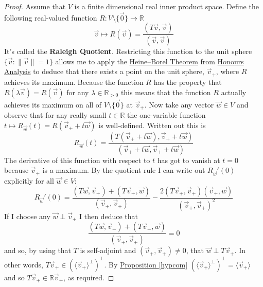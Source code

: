 \documentclass[11pt]{amsbook}
\theoremstyle{definition}
\begin{document}
\begin{proof}
Assume that $V$ is a finite dimensional real inner product space. Define the following real-valued function $R: V\setminus \{ \vec{0} \} \to\mathbb{R}$ $$\vec{v}\mapsto R(\vec{v}) = \frac{(T\vec{v}, \vec{v})}{(\vec{v}, \vec{v})}$$ It's called the {\bf Raleigh Quotient}. Restricting this function to the unit sphere $\{ \vec{v} : \| \vec{v} \| =1 \}$ allows me to apply the \href{http://en.wikipedia.org/wiki/Heine-Borel_theorem}{Heine--Borel Theorem} from \href{http://www.drps.ed.ac.uk/14-15/dpt/cxmath10068.htm}{Honours Analysis} to deduce that there exists a point on the unit sphere, $\vec{v}_+$, where $R$ achieves its maximum. Because the function $R$ has the property that $R(\lambda \vec{v}) = R(\vec{v})$ for any $\lambda \in \mathbb{R}_{>0}$ this means that the function $R$ actually achieves its maximum on all of $V\setminus \{ \vec{0} \}$ at $\vec{v}_+$. Now take any vector $\vec{w} \in V$ and observe that for any really small $t\in \mathbb{R}$ the one-variable function $t\mapsto R_{\vec{w}}(t) = R(\vec{v}_+ + t\vec{w})$ is well-defined. Written out this is $$R_{\vec{w}}(t) = \frac{ (T(\vec{v}_+ + t\vec{w}), \vec{v}_+ + t\vec{w})}{(\vec{v}_+ + t\vec{w},\vec{v}_+ + t\vec{w})}$$ The derivative of this function with respect to $t$ has got to vanish at $t=0$ because $\vec{v}_+$ is a maximum. By the quotient rule I can write out $R_{\vec{w}}'(0)$ explicitly for all $\vec{w}\in V$:
$$ R_{\vec{w}}'(0) = \frac{(T\vec{w}, \vec{v}_+) + (T\vec{v}_+, \vec{w})}{(\vec{v}_+, \vec{v}_+)} - \frac{2 (T\vec{v}_+, \vec{v}_+)(\vec{v}_+ , \vec{w})}{(\vec{v}_+, \vec{v}_+)^2}$$
If I choose any $\vec{w} \perp \vec{v}_+$ I then deduce that $$\frac{(T\vec{w}, \vec{v}_+) + (T\vec{v}_+, \vec{w})}{(\vec{v}_+, \vec{v}_+)} =0 $$ and so, by using that $T$ is self-adjoint and $(\vec{v}_+, \vec{v}_+) \neq 0$, that $\vec{w} \perp T\vec{v}_+$. In other words, $T\vec{v}_+ \in (\langle \vec{v}_+\rangle^{\perp})^{\perp}$. By \hyperref[hypcom]{Proposition \ref{hypcom}} $(\langle \vec{v}_+\rangle^{\perp})^{\perp} = \langle \vec{v}_+ \rangle$ and so  $T\vec{v}_+ \in \mathbb{R}\vec{v}_+$, as required.
\end{proof}
\end{document}
